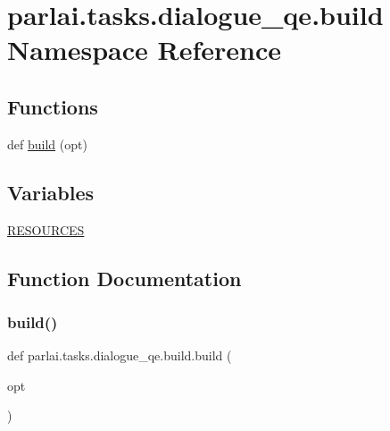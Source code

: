 \hypertarget{namespaceparlai_1_1tasks_1_1dialogue__qe_1_1build}{}\section{parlai.\+tasks.\+dialogue\+\_\+qe.\+build Namespace Reference}
\label{namespaceparlai_1_1tasks_1_1dialogue__qe_1_1build}
\subsection*{Functions}
\begin{DoxyCompactItemize}
\item 
def \hyperlink{namespaceparlai_1_1tasks_1_1dialogue__qe_1_1build_ab572df1748a38a9aa82871577c0cd8e6}{build} (opt)
\end{DoxyCompactItemize}
\subsection*{Variables}
\begin{DoxyCompactItemize}
\item 
\hyperlink{namespaceparlai_1_1tasks_1_1dialogue__qe_1_1build_a2a8edddb578c61b781b577f9c8d2d712}{R\+E\+S\+O\+U\+R\+C\+ES}
\end{DoxyCompactItemize}


\subsection{Function Documentation}
\mbox{\label{namespaceparlai_1_1tasks_1_1dialogue__qe_1_1build_ab572df1748a38a9aa82871577c0cd8e6}} 
\subsubsection{\texorpdfstring{build()}{build()}}
{\footnotesize\ttfamily def parlai.\+tasks.\+dialogue\+\_\+qe.\+build.\+build (\begin{DoxyParamCaption}\item[{}]{opt }\end{DoxyParamCaption})}



